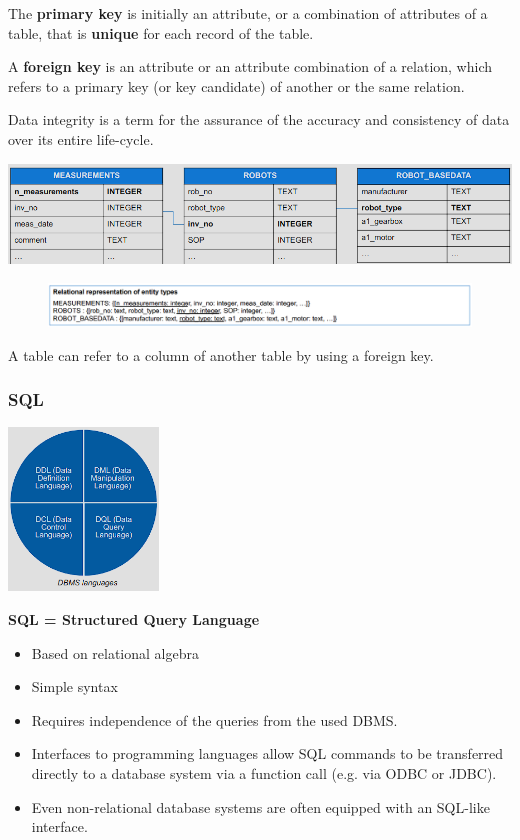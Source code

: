 \documentclass[12pt, a4paper, oneside, justified]{article}
\begin{document}
The \textbf{primary key} is initially an attribute, or a combination of attributes of a table, that is \textbf{unique} for each record of the table.

A \textbf{foreign key} is an attribute or an attribute combination of a relation, which refers to a primary key (or key candidate) of another or the same relation.

Data integrity is a term for the assurance of the accuracy and consistency of data over its entire life-cycle.

\begin{center}
\includegraphics[width=1\textwidth]{../img/3-9.png}
\end{center}

\begin{figure}[!h]
    \centering
    \includegraphics[width=1\textwidth]{../img/3-21}
    \label{img/3-21}
\end{figure}

A table can refer to a column of another table by using a foreign key.

\subsubsection{SQL}

\begin{center}
\includegraphics[width=0.3\textwidth]{../img/3-10.png}
\end{center}

\textbf{SQL = Structured Query Language}
\begin{itemize}
    \item Based on relational algebra
    \item Simple syntax
    \item Requires independence of the queries from the used DBMS.
    \item Interfaces to programming languages allow SQL commands to be transferred directly to a database system via a function call (e.g. via ODBC or JDBC).
    \item Even non-relational database systems are often equipped with an SQL-like interface.
\end{itemize}
\end{document}
